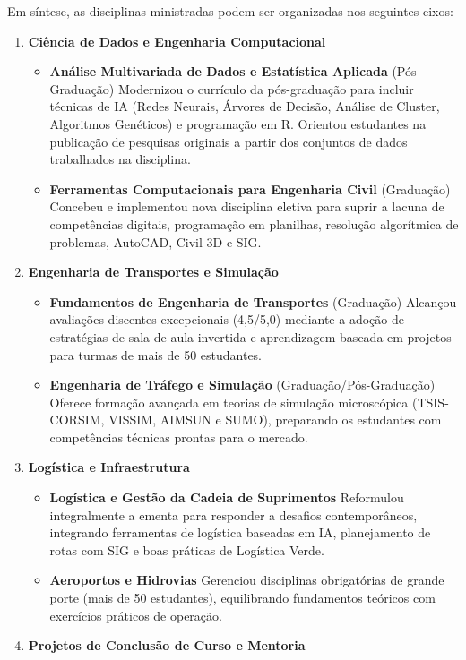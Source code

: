 \documentclass[
  brazilian,
  11pt,
  a4paper,
]{article}
\providecommand{\tightlist}{%
  \setlength{\itemsep}{0pt}\setlength{\parskip}{0pt}}
\begin{document}
Em síntese, as disciplinas ministradas podem ser organizadas nos
seguintes eixos:

\begin{enumerate}
\def\labelenumi{\arabic{enumi}.}
\tightlist
\item
  \textbf{Ciência de Dados e Engenharia Computacional}

  \begin{itemize}
  \tightlist
  \item
    \textbf{Análise Multivariada de Dados e Estatística Aplicada}
    (Pós-Graduação) Modernizou o currículo da pós-graduação para incluir
    técnicas de IA (Redes Neurais, Árvores de Decisão, Análise de
    Cluster, Algoritmos Genéticos) e programação em R. Orientou
    estudantes na publicação de pesquisas originais a partir dos
    conjuntos de dados trabalhados na disciplina.
  \item
    \textbf{Ferramentas Computacionais para Engenharia Civil}
    (Graduação) Concebeu e implementou nova disciplina eletiva para
    suprir a lacuna de competências digitais, programação em planilhas,
    resolução algorítmica de problemas, AutoCAD, Civil 3D e SIG.
  \end{itemize}
\item
  \textbf{Engenharia de Transportes e Simulação}

  \begin{itemize}
  \tightlist
  \item
    \textbf{Fundamentos de Engenharia de Transportes} (Graduação)
    Alcançou avaliações discentes excepcionais (4,5/5,0) mediante a
    adoção de estratégias de sala de aula invertida e aprendizagem
    baseada em projetos para turmas de mais de 50 estudantes.
  \item
    \textbf{Engenharia de Tráfego e Simulação} (Graduação/Pós-Graduação)
    Oferece formação avançada em teorias de simulação microscópica
    (TSIS-CORSIM, VISSIM, AIMSUN e SUMO), preparando os estudantes com
    competências técnicas prontas para o mercado.
  \end{itemize}
\item
  \textbf{Logística e Infraestrutura}

  \begin{itemize}
  \tightlist
  \item
    \textbf{Logística e Gestão da Cadeia de Suprimentos} Reformulou
    integralmente a ementa para responder a desafios contemporâneos,
    integrando ferramentas de logística baseadas em IA, planejamento de
    rotas com SIG e boas práticas de Logística Verde.
  \item
    \textbf{Aeroportos e Hidrovias} Gerenciou disciplinas obrigatórias
    de grande porte (mais de 50 estudantes), equilibrando fundamentos
    teóricos com exercícios práticos de operação.
  \end{itemize}
\item
  \textbf{Projetos de Conclusão de Curso e Mentoria}


\end{enumerate}
\end{document}
